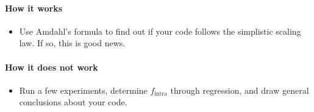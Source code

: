 \paragraph*{How it works}

\begin{itemize}[noitemsep]
  \item[$\boxplus$] Use Amdahl's formula to find out if your code follows 
  the simplistic scaling law. If so, this is good news.
\end{itemize}


\paragraph*{How it does not work}

\begin{itemize}[noitemsep]
  \item[$\boxminus$] Run a few experiments, determine $f_{\text{intra}}$ through
  regression, and draw general conclusions about your code.
\end{itemize}





